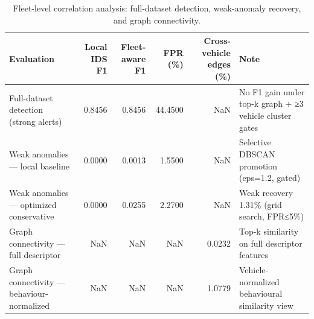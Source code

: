 \begin{table}[t]
\centering
\begin{tabular}{lrrrrl}
\toprule
Evaluation & Local IDS F1 & Fleet-aware F1 & FPR (\%) & Cross-vehicle edges (\%) & Note \\
\midrule
Full-dataset detection (strong alerts) & 0.8456 & 0.8456 & 44.4500 & NaN & No F1 gain under top-k graph + ≥3 vehicle cluster gates \\
Weak anomalies — local baseline & 0.0000 & 0.0013 & 1.5500 & NaN & Selective DBSCAN promotion (eps=1.2, gated) \\
Weak anomalies — optimized conservative & 0.0000 & 0.0255 & 2.2700 & NaN & Weak recovery 1.31\% (grid search, FPR≤5\%) \\
Graph connectivity — full descriptor & NaN & NaN & NaN & 0.0232 & Top-k similarity on full descriptor features \\
Graph connectivity — behaviour-normalized & NaN & NaN & NaN & 1.0779 & Vehicle-normalized behavioural similarity view \\
\bottomrule
\end{tabular}
\caption{Fleet-level correlation analysis: full-dataset detection, weak-anomaly recovery, and graph connectivity.}
\label{tab:fleet-correlation}
\end{table}
